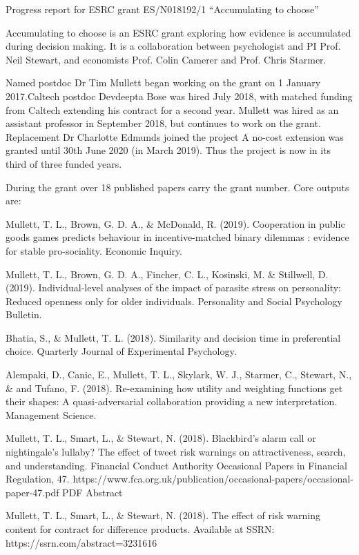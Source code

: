 Progress report for ESRC grant ES/N018192/1 ``Accumulating to choose''

Accumulating to choose is an ESRC grant exploring how evidence is accumulated during decision making. It is a collaboration between psychologist and PI Prof. Neil Stewart, and economists Prof. Colin Camerer and Prof. Chris Starmer.  

Named postdoc Dr Tim Mullett began working on the grant on 1 January 2017.Caltech postdoc Devdeepta Bose was hired July 2018, with matched funding from Caltech extending his contract for a second year.  Mullett was hired as an assistant professor in September 2018, but continues to work on the grant. Replacement Dr Charlotte Edmunds joined the project A no-cost extension was granted until 30th June 2020 (in March 2019). Thus the project is now in its third of three funded years.

During the grant over 18 published papers carry the grant number. Core outputs are:

Mullett, T. L., Brown, G. D. A., \& McDonald, R. (2019). Cooperation in public goods games predicts behaviour in incentive-matched binary dilemmas : evidence for stable pro-sociality. Economic Inquiry.

Mullett, T. L., Brown, G. D. A., Fincher, C. L., Kosinski, M. \& Stillwell, D. (2019). Individual-level analyses of the impact of parasite stress on personality: Reduced openness only for older individuals. Personality and Social Psychology Bulletin.

Bhatia, S., \& Mullett, T. L. (2018). Similarity and decision time in preferential choice. Quarterly Journal of Experimental Psychology.

Alempaki, D., Canic, E., Mullett, T. L., Skylark, W. J., Starmer, C., Stewart, N., \& and Tufano, F. (2018). Re-examining how utility and weighting functions get their shapes: A quasi-adversarial collaboration providing a new interpretation. Management Science.

Mullett, T. L., Smart, L., \& Stewart, N. (2018). Blackbird's alarm call or nightingale's lullaby? The effect of tweet risk warnings on attractiveness, search, and understanding. Financial Conduct Authority Occasional Papers in Financial Regulation, 47. https://www.fca.org.uk/publication/occasional-papers/occasional-paper-47.pdf PDF 
Abstract

Mullett, T. L., Smart, L., \& Stewart, N. (2018). The effect of risk warning content for contract for difference products. Available at SSRN: https://ssrn.com/abstract=3231616

